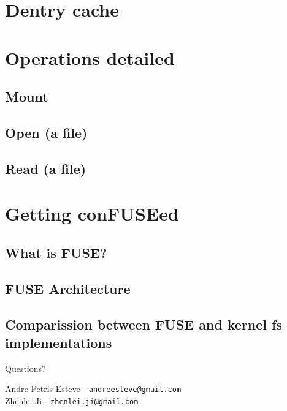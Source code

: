 \documentclass{beamer}
\begin{document}
\section{Dentry cache}


\section{Operations detailed}

\subsection{Mount}

\subsection{Open (a file)}

\subsection{Read (a file)}


\section{Getting conFUSEed}

\subsection{What is FUSE?}

\subsection{FUSE Architecture}

\subsection{Comparission between FUSE and kernel fs implementations}


\begin{frame}[plain]

  \begin{center}
    \Huge Questions?
  \end{center}

  \vspace{0.2in}

  \begin{center}
	Andre Petris Esteve - \texttt{andreesteve@gmail.com}\\
	Zhenlei Ji - \texttt{zhenlei.ji@gmail.com}
  \end{center}
\end{frame}
\end{document}
